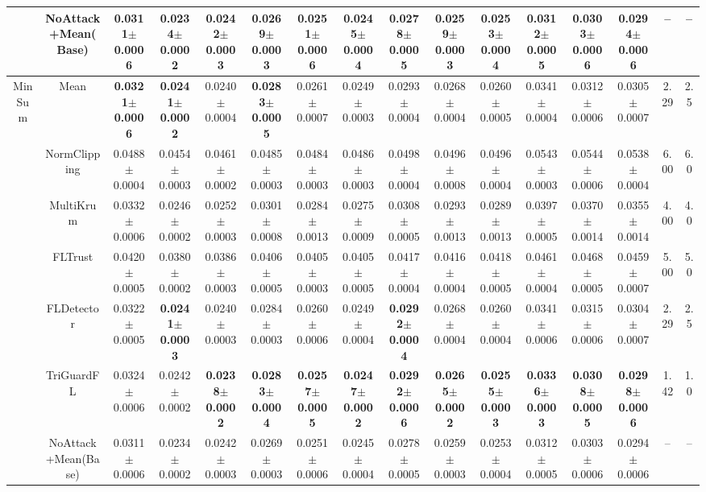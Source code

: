 \begin{table}[t]
\begin{tabular}{c c c c c c c c c c c c c c c c}
 & NoAttack+Mean(Base) & 0.0311$\pm$0.0006 & 0.0234$\pm$0.0002 & 0.0242$\pm$0.0003 & 0.0269$\pm$0.0003 & 0.0251$\pm$0.0006 & 0.0245$\pm$0.0004 & 0.0278$\pm$0.0005 & 0.0259$\pm$0.0003 & 0.0253$\pm$0.0004 & 0.0312$\pm$0.0005 & 0.0303$\pm$0.0006 & 0.0294$\pm$0.0006 & -- & -- \\
\midrule
\multirow{6}{*}{MinSum} & Mean & \textbf{0.0321$\pm$0.0006} & \textbf{0.0241$\pm$0.0002} & 0.0240$\pm$0.0004 & \textbf{0.0283$\pm$0.0005} & 0.0261$\pm$0.0007 & 0.0249$\pm$0.0003 & 0.0293$\pm$0.0004 & 0.0268$\pm$0.0004 & 0.0260$\pm$0.0005 & 0.0341$\pm$0.0004 & 0.0312$\pm$0.0006 & 0.0305$\pm$0.0007 & 2.29 & 2.5 \\
 & NormClipping & 0.0488$\pm$0.0004 & 0.0454$\pm$0.0003 & 0.0461$\pm$0.0002 & 0.0485$\pm$0.0003 & 0.0484$\pm$0.0003 & 0.0486$\pm$0.0003 & 0.0498$\pm$0.0004 & 0.0496$\pm$0.0008 & 0.0496$\pm$0.0004 & 0.0543$\pm$0.0003 & 0.0544$\pm$0.0006 & 0.0538$\pm$0.0004 & 6.00 & 6.0 \\
 & MultiKrum & 0.0332$\pm$0.0006 & 0.0246$\pm$0.0002 & 0.0252$\pm$0.0003 & 0.0301$\pm$0.0008 & 0.0284$\pm$0.0013 & 0.0275$\pm$0.0009 & 0.0308$\pm$0.0005 & 0.0293$\pm$0.0013 & 0.0289$\pm$0.0013 & 0.0397$\pm$0.0005 & 0.0370$\pm$0.0014 & 0.0355$\pm$0.0014 & 4.00 & 4.0 \\
 & FLTrust & 0.0420$\pm$0.0005 & 0.0380$\pm$0.0002 & 0.0386$\pm$0.0003 & 0.0406$\pm$0.0005 & 0.0405$\pm$0.0003 & 0.0405$\pm$0.0005 & 0.0417$\pm$0.0004 & 0.0416$\pm$0.0004 & 0.0418$\pm$0.0005 & 0.0461$\pm$0.0004 & 0.0468$\pm$0.0005 & 0.0459$\pm$0.0007 & 5.00 & 5.0 \\
 & FLDetector & 0.0322$\pm$0.0005 & \textbf{0.0241$\pm$0.0003} & 0.0240$\pm$0.0003 & 0.0284$\pm$0.0003 & 0.0260$\pm$0.0006 & 0.0249$\pm$0.0004 & \textbf{0.0292$\pm$0.0004} & 0.0268$\pm$0.0004 & 0.0260$\pm$0.0004 & 0.0341$\pm$0.0006 & 0.0315$\pm$0.0006 & 0.0304$\pm$0.0007 & 2.29 & 2.5 \\
 & \cellcolor{mygray}TriGuardFL & \cellcolor{mygray}0.0324$\pm$0.0006 & \cellcolor{mygray}0.0242$\pm$0.0002 & \cellcolor{mygray}\textbf{0.0238$\pm$0.0002} & \cellcolor{mygray}\textbf{0.0283$\pm$0.0004} & \cellcolor{mygray}\textbf{0.0257$\pm$0.0005} & \cellcolor{mygray}\textbf{0.0247$\pm$0.0002} & \cellcolor{mygray}\textbf{0.0292$\pm$0.0006} & \cellcolor{mygray}\textbf{0.0265$\pm$0.0002} & \cellcolor{mygray}\textbf{0.0255$\pm$0.0003} & \cellcolor{mygray}\textbf{0.0336$\pm$0.0003} & \cellcolor{mygray}\textbf{0.0308$\pm$0.0005} & \cellcolor{mygray}\textbf{0.0298$\pm$0.0006} & \cellcolor{mygray}1.42 & \cellcolor{mygray}1.0 \\
 & NoAttack+Mean(Base) & 0.0311$\pm$0.0006 & 0.0234$\pm$0.0002 & 0.0242$\pm$0.0003 & 0.0269$\pm$0.0003 & 0.0251$\pm$0.0006 & 0.0245$\pm$0.0004 & 0.0278$\pm$0.0005 & 0.0259$\pm$0.0003 & 0.0253$\pm$0.0004 & 0.0312$\pm$0.0005 & 0.0303$\pm$0.0006 & 0.0294$\pm$0.0006 & -- & -- \\
\bottomrule
\end{tabular}
\end{table}

